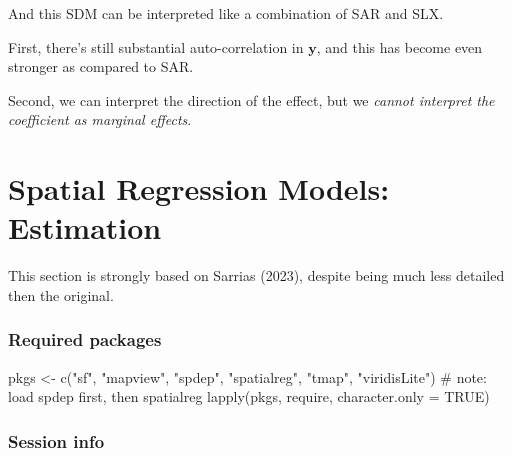 \documentclass[
  letterpaper,
  DIV=11,
  numbers=noendperiod]{scrreprt}
\newenvironment{Shaded}{\begin{snugshade}}{\end{snugshade}}
\newcommand{\AttributeTok}[1]{\textcolor[rgb]{0.40,0.45,0.13}{#1}}
\newcommand{\CommentTok}[1]{\textcolor[rgb]{0.37,0.37,0.37}{#1}}
\newcommand{\ConstantTok}[1]{\textcolor[rgb]{0.56,0.35,0.01}{#1}}
\newcommand{\FunctionTok}[1]{\textcolor[rgb]{0.28,0.35,0.67}{#1}}
\newcommand{\NormalTok}[1]{\textcolor[rgb]{0.00,0.23,0.31}{#1}}
\newcommand{\OtherTok}[1]{\textcolor[rgb]{0.00,0.23,0.31}{#1}}
\newcommand{\StringTok}[1]{\textcolor[rgb]{0.13,0.47,0.30}{#1}}
\begin{document}
And this SDM can be interpreted like a combination of SAR and SLX.

First, there's still substantial auto-correlation in
\(\boldsymbol{\mathbf{y}}\), and this has become even stronger as
compared to SAR.

Second, we can interpret the direction of the effect, but we
\emph{cannot interpret the coefficient as marginal effects}.


\hypertarget{spatial-regression-models-estimation}{%
\chapter{Spatial Regression Models:
Estimation}\label{spatial-regression-models-estimation}}

\newcommand{\Exp}{\mathrm{E}}
\newcommand\given[1][]{\:#1\vert\:}
\newcommand{\Cov}{\mathrm{Cov}}
\newcommand{\Var}{\mathrm{Var}}
\newcommand{\rank}{\mathrm{rank}}
\newcommand{\bm}[1]{\boldsymbol{\mathbf{#1}}}
\newcommand{\tr}{\mathrm{tr}}
\newcommand{\plim}{\operatornamewithlimits{plim}}
\newcommand{\diag}{\mathrm{diag}}

This section is strongly based on Sarrias (2023), despite being much
less detailed then the original.

\hypertarget{required-packages-6}{%
\subsection*{Required packages}\label{required-packages-6}}

\begin{Shaded}
\begin{Highlighting}[]
\NormalTok{pkgs }\OtherTok{\textless{}{-}} \FunctionTok{c}\NormalTok{(}\StringTok{"sf"}\NormalTok{, }\StringTok{"mapview"}\NormalTok{, }\StringTok{"spdep"}\NormalTok{, }\StringTok{"spatialreg"}\NormalTok{, }\StringTok{"tmap"}\NormalTok{, }\StringTok{"viridisLite"}\NormalTok{) }\CommentTok{\# note: load spdep first, then spatialreg}
\FunctionTok{lapply}\NormalTok{(pkgs, require, }\AttributeTok{character.only =} \ConstantTok{TRUE}\NormalTok{)}
\end{Highlighting}
\end{Shaded}

\hypertarget{session-info-6}{%
\subsection*{Session info}\label{session-info-6}}
\end{document}
